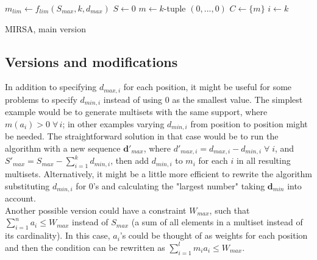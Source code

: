\documentclass[12pt]{article}
\begin{document}
\begin{algorithm}[H]

  \BlankLine
  $m_{lim} \gets f_{lim}(S_{max}, k, d_{max})$\;
  $S \gets 0$\;
  $m \gets k$-tuple $(0, ..., 0)$\;
  $C \gets \{m\}$
  $i \gets k$\;
  \caption{MIRSA, main version}
\end{algorithm}  

\subsection{Versions and modifications} \label{sec:mod}

In addition to specifying $d_{max, i}$ for each position, it might be useful for some problems to specify $d_{min, i}$ instead of using $0$ as the smallest value. The simplest example would be to generate multisets with the same support, where $m(a_i) > 0 \; \forall \, i$; in other examples varying $d_{min, i}$ from position to position might be needed. The straightforward solution in that case would be to run the algorithm with a new sequence $\boldsymbol{d}'_{max}$, where $d'_{max, i} = d_{max, i} - d_{min, i} \; \forall \; i$, and $S'_{max} = S_{max} - \sum_{i = 1}^k d_{min, i}$, then add $d_{min, i}$ to $m_i$ for each $i$ in all resulting multisets. Alternatively, it might be a little more efficient to rewrite the algorithm substituting $d_{min, i}$ for $0$'s and calculating the "largest number" taking $\boldsymbol{d}_{min}$ into account. \\

Another possible version could have a constraint $W_{max}$, such that $\sum_{i = 1}^n a_i \leqslant W_{max}$ instead of $S_{max}$ (a sum of all elements in a multiset instead of its cardinality). In this case, $a_i$'s could be thought of as weights for each position and then the condition can be rewritten as $\sum_{i = 1}^l m_i a_i \leqslant W_{max}$. \\
\end{document}
